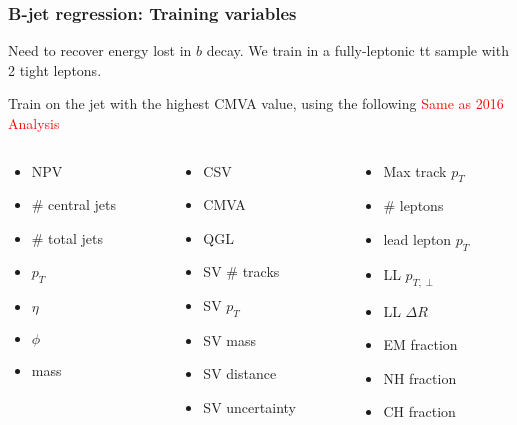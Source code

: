\documentclass{beamer}
\begin{document}
\begin{frame}
  \frametitle{B-jet regression: Training variables}

  Need to recover energy lost in $b$ decay. We train in a fully-leptonic tt sample
  with 2 tight leptons.

  \hspace{12pt}

  Train on the jet with the highest CMVA value, using the following \textcolor{red}{Same as 2016 Analysis}

  \begin{columns}
    \begin{column}{0.33\linewidth}
      \begin{itemize}
      \item NPV
      \item \# central jets
      \item \# total jets
      \item $p_T$
      \item $\eta$
      \item $\phi$
      \item mass
      \end{itemize}
    \end{column}
    \begin{column}{0.33\linewidth}
      \begin{itemize}
      \item CSV
      \item CMVA
      \item QGL
      \item SV \# tracks
      \item SV $p_T$
      \item SV mass
      \item SV distance
      \item SV uncertainty
      \end{itemize}
    \end{column}
    \begin{column}{0.33\linewidth}
      \begin{itemize}
      \item Max track $p_T$
      \item \# leptons
      \item lead lepton $p_T$
      \item LL $p_{T, \perp}$
      \item LL $\Delta R$
      \item EM fraction
      \item NH fraction
      \item CH fraction
      \end{itemize}
    \end{column}
  \end{columns}

\end{frame}
\end{document}
